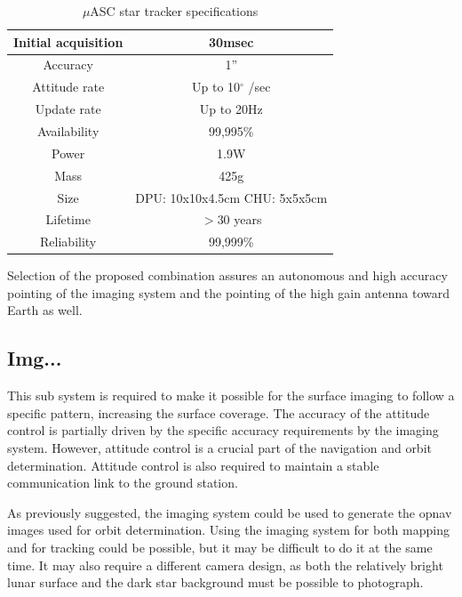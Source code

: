 \begin{table}[htb]
  \centering
    \begin{tabular}{|r|c|}
    \hline
    Initial acquisition & 30msec \bigstrut\\
    \hline
    \multicolumn{1}{|c|}{Accuracy} & 1” \bigstrut\\
    \hline
    \multicolumn{1}{|c|}{Attitude rate} & Up to 10$^{\circ}$ /sec \bigstrut\\
    \hline
    \multicolumn{1}{|c|}{Update rate} & Up to 20Hz \bigstrut\\
    \hline
    \multicolumn{1}{|c|}{Availability} & 99,995\% \bigstrut\\
    \hline
    \multicolumn{1}{|c|}{Power} & 1.9W \bigstrut\\
    \hline
    \multicolumn{1}{|c|}{Mass} & 425g \bigstrut\\
    \hline
    \multicolumn{1}{|c|}{Size} & DPU: 10x10x4.5cm CHU: 5x5x5cm \bigstrut\\
    \hline
    \multicolumn{1}{|c|}{Lifetime} & $>$30 years \bigstrut\\
    \hline
    \multicolumn{1}{|c|}{Reliability} & 99,999\% \bigstrut\\
    \hline
    \end{tabular}%
    \caption{$\mu$ASC star tracker specifications \cite {masc}}
  \label{tab:masc}%
\end{table}%
Selection of the proposed combination assures an autonomous and high accuracy pointing of the imaging system and the pointing of the high gain antenna toward Earth as well. 
\subsection*{Img...}
This sub system is required to make it possible for the surface imaging to follow a specific pattern, increasing the surface coverage. The accuracy of the attitude control is partially driven by the specific accuracy requirements by the imaging system. However, attitude control is a crucial part of the navigation and orbit determination. Attitude control is also required to maintain a stable communication link to the ground station. 

As previously suggested, the imaging system could be used to generate the opnav images used for orbit determination. Using the imaging system for both mapping and for tracking could be possible, but it may be difficult to do it at the same time. It may also require a different camera design, as both the relatively bright lunar surface and the dark star background must be possible to photograph.

